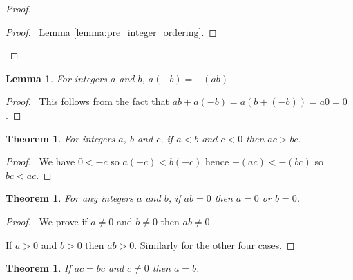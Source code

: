 \documentclass{article}
\let\qed\relax
\newtheorem{lemma}[axiom]{Lemma}
\newtheorem{theorem}[axiom]{Theorem}
\theoremstyle{definition}
\begin{document}
    \begin{proof}
        \pf
        \begin{proof}
            \pf\ Lemma \ref{lemma:pre_integer_ordering}.
        \end{proof}
        \qed
    \end{proof}

    \begin{lemma}
        For integers $a$ and $b$,
        $a(-b) = -(ab)$
    \end{lemma}

    \begin{proof}
        \pf\ This follows from the fact that $ab + a(-b) = a(b + (-b)) = a0 = 0$. \qed
    \end{proof}

    \begin{theorem}
        For integers $a$, $b$ and $c$, if $a < b$ and $c < 0$ then $ac > bc$.
    \end{theorem}

    \begin{proof}
        \pf\ We have $0 < -c$ so $a(-c) < b(-c)$ hence $-(ac) < -(bc)$ so $bc < ac$. \qed
    \end{proof}

    \begin{theorem}
        \label{theorem:integers_no_zero_divisors}
        For any integers $a$ and $b$, if $ab = 0$ then $a = 0$ or $b = 0$.
    \end{theorem}

    \begin{proof}
        \pf\ We prove if $a \neq 0$ and $b \neq 0$ then $ab \neq 0$.
        
        If $a > 0$ and $b > 0$ then $ab > 0$. Similarly for the other four cases. \qed
    \end{proof}

    \begin{theorem}
        \label{theorem:integers_cancel}
        If $ac = bc$ and $c \neq 0$ then $a = b$.
    \end{theorem}
\end{document}

